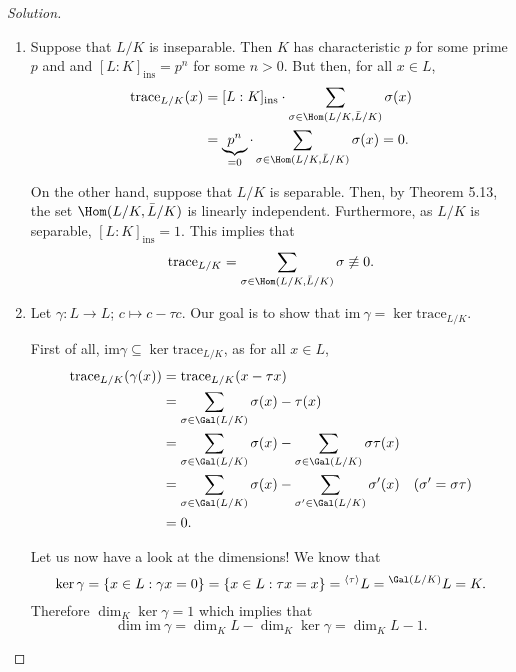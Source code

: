 \documentclass[a4paper,10pt,reqno]{amsart}
\newenvironment{sol}
  {\renewcommand\qedsymbol{$\blacksquare$}\begin{proof}[Solution]}
  {\end{proof}}
\begin{document}
\begin{sol}
    \begin{enumerate}[label=(\roman*)]
        \item Suppose that $L/K$ is inseparable. Then $K$ has characteristic $p$ for some prime $p$ and and $[L:K]_{\mathrm{ins}} = p^n$ for some $n > 0$. But then, for all $x \in L$,
        \begin{align*}
            \mathrm{trace}_{L/K}(x) & = [L:K]_{\mathrm{ins}} \cdot \sum_{\sigma \in \Hom(L/K,\Bar{L}/K)} \sigma(x) \\
            & = \underbrace{p^n}_{=0} \cdot \sum_{\sigma \in \Hom(L/K,\Bar{L}/K)} \sigma(x) = 0.
        \end{align*}

        On the other hand, suppose that $L/K$ is separable. Then, by Theorem 5.13, the set $\Hom(L/K,\Bar{L}/K)$ is linearly independent. Furthermore, as $L/K$ is separable, $[L:K]_{\mathrm{ins}} = 1$. This implies that
        \[
        \mathrm{trace}_{L/K} = \sum_{\sigma \in \Hom(L/K,\Bar{L}/K)} \sigma \not \equiv 0.
        \]

        \item Let $\gamma: L \to L$; $c \mapsto c - \tau c$. Our goal is to show that $\mathrm{im}\ \gamma = \ker \mathrm{trace}_{L/K}$.

        First of all, $\mathrm{im} \gamma \subseteq  \ker \mathrm{trace}_{L/K}$, as for all $x \in L$,
        \begin{align*}
        \mathrm{trace}_{L/K}(\gamma(x)) & = \mathrm{trace}_{L/K}(x - \tau x) \\
        & = \sum_{\sigma \in \Gal(L/K)} \sigma(x) - \tau(x) \\
        & =  \sum_{\sigma \in \Gal(L/K)} \sigma(x) - \sum_{\sigma \in \Gal(L/K)} \sigma \tau(x) \\
        & = \sum_{\sigma \in \Gal(L/K)} \sigma(x) - \sum_{\sigma^{\prime} \in \Gal(L/K)} \sigma^{\prime}(x) \quad (\sigma^{\prime} = \sigma \tau ) \\
        & = 0.
        \end{align*}

        Let us now have a look at the dimensions! We know that
        \[
        \ker \gamma = \{ x \in L: \gamma x = 0 \} = \{ x \in L : \tau x = x \} = {}^{\left\langle \tau \right\rangle} L = {}^{\Gal(L/K)}L = K. 
        \]
        Therefore $\dim_K \ker \gamma = 1$ which implies that
        \[
        \dim \mathrm{im}\ \gamma = \dim_KL - \dim_K \ker \gamma = \dim_KL - 1.
        \]


\end{enumerate}
\end{sol}
\end{document}
